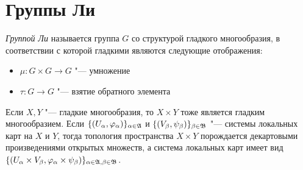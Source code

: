 \section{Группы Ли}

\begin{definition}
	\textit{Группой Ли} называется группа $G$ со структурой гладкого многообразия, в соответствии с которой гладкими являются следующие отображения:
	\begin{itemize}
		\item $\mu: G \times G \to G$ "--- умножение
		\item $\tau: G \to G$ "--- взятие обратного элемента
	\end{itemize}
\end{definition}

\begin{note}
	Если $X, Y$ "--- гладкие многообразия, то $X \times Y$ тоже является гладким многообразием. Если $\{(U_\alpha, \varphi_\alpha)\}_{\alpha \in \mathfrak A}$ и $\{(V_\beta, \psi_\beta)\}_{\beta \in \mathfrak B}$ "--- системы локальных карт на $X$ и $Y$, тогда топология пространства $X \times Y$ порождается декартовыми произведениями открытых множеств, а система локальных карт имеет вид $\{(U_\alpha \times V_\beta, \varphi_\alpha \times \psi_\beta)\}_{\alpha \in \mathfrak A, \beta \in \mathfrak B}$.
\end{note}

